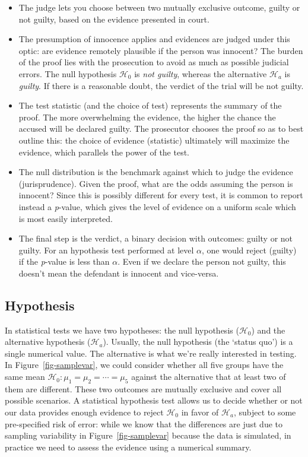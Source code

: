 \documentclass[
  11pt,
  letterpaper,
]{scrbook}
\providecommand{\tightlist}{%
  \setlength{\itemsep}{0pt}\setlength{\parskip}{0pt}}\usepackage{longtable,booktabs,array}
\theoremstyle{definition}
\theoremstyle{remark}
\begin{document}
\begin{itemize}
\tightlist
\item
  The judge lets you choose between two mutually exclusive outcome,
  guilty or not guilty, based on the evidence presented in court.
\item
  The presumption of innocence applies and evidences are judged under
  this optic: are evidence remotely plausible if the person was
  innocent? The burden of the proof lies with the prosecution to avoid
  as much as possible judicial errors. The null hypothesis
  \(\mathscr{H}_0\) is \emph{not guilty}, whereas the alternative
  \(\mathscr{H}_a\) is \emph{guilty}. If there is a reasonable doubt,
  the verdict of the trial will be not guilty.
\item
  The test statistic (and the choice of test) represents the summary of
  the proof. The more overwhelming the evidence, the higher the chance
  the accused will be declared guilty. The prosecutor chooses the proof
  so as to best outline this: the choice of evidence (statistic)
  ultimately will maximize the evidence, which parallels the power of
  the test.
\item
  The null distribution is the benchmark against which to judge the
  evidence (jurisprudence). Given the proof, what are the odds assuming
  the person is innocent? Since this is possibly different for every
  test, it is common to report instead a \emph{p}-value, which gives the
  level of evidence on a uniform scale which is most easily interpreted.
\item
  The final step is the verdict, a binary decision with outcomes: guilty
  or not guilty. For an hypothesis test performed at level \(\alpha\),
  one would reject (guilty) if the \emph{p}-value is less than
  \(\alpha\). Even if we declare the person not guilty, this doesn't
  mean the defendant is innocent and vice-versa.
\end{itemize}

\hypertarget{hypothesis-1}{%
\subsection{Hypothesis}\label{hypothesis-1}}

In statistical tests we have two hypotheses: the null hypothesis
(\(\mathscr{H}_0\)) and the alternative hypothesis (\(\mathscr{H}_a\)).
Usually, the null hypothesis (the `status quo') is a single numerical
value. The alternative is what we're really interested in testing. In
Figure~\ref{fig-samplevar}, we could consider whether all five groups
have the same mean \(\mathscr{H}_0: \mu_1 = \mu_2 = \cdots = \mu_5\)
against the alternative that at least two of them are different. These
two outcomes are mutually exclusive and cover all possible scenarios. A
statistical hypothesis test allows us to decide whether or not our data
provides enough evidence to reject \(\mathscr{H}_0\) in favor of
\(\mathscr{H}_a\), subject to some pre-specified risk of error: while we
know that the differences are just due to sampling variability in
Figure~\ref{fig-samplevar} because the data is simulated, in practice we
need to assess the evidence using a numerical summary.
\end{document}
